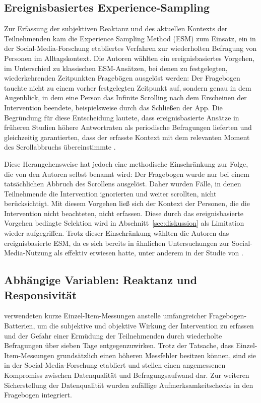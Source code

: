 \documentclass[11pt,a4paper]{article}
\begin{document}
\subsection{Ereignisbasiertes Experience-Sampling}

Zur Erfassung der subjektiven Reaktanz und des aktuellen Kontexts der Teilnehmenden kam die
Experience Sampling Method (ESM) zum Einsatz, ein in der Social-Media-Forschung etabliertes
Verfahren zur wiederholten Befragung von Personen im Alltagskontext. Die Autoren wählten ein
ereignisbasiertes Vorgehen, im Unterschied zu klassischen ESM-Ansätzen, bei denen zu
festgelegten, wiederkehrenden Zeitpunkten Fragebögen ausgelöst werden: Der Fragebogen
tauchte nicht zu einem vorher festgelegten Zeitpunkt auf, sondern genau in dem Augenblick,
in dem eine Person das Infinite Scrolling nach dem Erscheinen der Intervention beendete,
beispielsweise durch das Schließen der App. Die Begründung für diese Entscheidung lautete,
dass ereignisbasierte Ansätze in früheren Studien höhere Antwortraten als periodische
Befragungen lieferten und gleichzeitig garantierten, dass der erfasste Kontext mit dem
relevanten Moment des Scrollabbruchs übereinstimmte \citep{meinhardt2025scrolling}.

Diese Herangehensweise hat jedoch eine methodische Einschränkung zur Folge, die von den
Autoren selbst benannt wird: Der Fragebogen wurde nur bei einem tatsächlichen Abbruch des
Scrollens ausgelöst. Daher wurden Fälle, in denen Teilnehmende die Intervention ignorierten
und weiter scrollten, nicht berücksichtigt. Mit diesem Vorgehen ließ sich der Kontext der
Personen, die die Intervention nicht beachteten, nicht erfassen. Diese durch das
ereignisbasierte Vorgehen bedingte Selektion wird in Abschnitt~\ref{sec:diskussion} als
Limitation wieder aufgegriffen. Trotz dieser Einschränkung
wählten die Autoren das ereignisbasierte ESM, da es sich bereits in ähnlichen Untersuchungen
zur Social-Media-Nutzung als effektiv erwiesen hatte, unter anderem in der Studie von
\citet{rixen2023loop}.

\subsection{Abhängige Variablen: Reaktanz und Responsivität}

\citet{meinhardt2025scrolling} verwendeten kurze Einzel-Item-Messungen anstelle umfangreicher
Fragebogen-Batterien, um die subjektive und objektive Wirkung der Intervention zu erfassen
und der Gefahr einer Ermüdung der Teilnehmenden durch wiederholte Befragungen über sieben
Tage entgegenzuwirken. Trotz der Tatsache, dass Einzel-Item-Messungen grundsätzlich einen
höheren Messfehler besitzen können, sind sie in der Social-Media-Forschung etabliert und
stellen einen angemessenen Kompromiss zwischen Datenqualität und Befragungsaufwand dar. Zur
weiteren Sicherstellung der Datenqualität wurden zufällige Aufmerksamkeitschecks in den
Fragebogen integriert.
\end{document}
